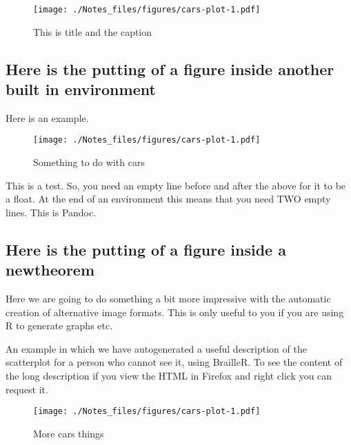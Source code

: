 \documentclass[
  10pt,
  english,
  a4paper]{article}
\theoremstyle{plain}
\theoremstyle{definition}
\theoremstyle{plain}
\theoremstyle{plain}
\theoremstyle{plain}
\theoremstyle{plain}
\theoremstyle{plain}
\theoremstyle{definition}
\theoremstyle{definition}
\theoremstyle{remark}
\theoremstyle{remark}
\let\BeginKnitrBlock\begin \let\EndKnitrBlock\end
\begin{document}
\begin{figure}
\centering
\texttt{[image: ./Notes\_files/figures/cars-plot-1.pdf]}
\caption{\label{fig:cars1}This is title and the caption}
\end{figure}

\hypertarget{here-is-the-putting-of-a-figure-inside-another-built-in-environment}{%
\subsection{Here is the putting of a figure inside another built in environment}\label{here-is-the-putting-of-a-figure-inside-another-built-in-environment}}

\BeginKnitrBlock{example}
{\label{exm:unnamed-chunk-4} }Here is an example.

\begin{figure}
\centering
\texttt{[image: ./Notes\_files/figures/cars-plot-1.pdf]}
\caption{\label{fig:cars2}Something to do with cars}
\end{figure}

This is a test. So, you need an empty line before and after the above for it to be a float. At the end of an environment this means that you need TWO empty lines. This is Pandoc.
\EndKnitrBlock{example}

\hypertarget{here-is-the-putting-of-a-figure-inside-a-newtheorem}{%
\subsection{Here is the putting of a figure inside a newtheorem}\label{here-is-the-putting-of-a-figure-inside-a-newtheorem}}

Here we are going to do something a bit more impressive with the automatic creation of alternative image formats. This is only useful to you if you are using R to generate graphs etc.

\BeginKnitrBlock{Example}
{\iffalse{} (\#\url{Example:unnamed-chunk-5}) \fi{}}An example in which we have autogenerated a useful description of the scatterplot for a person who cannot see it, using BrailleR. To see the content of the long description if you view the HTML in Firefox and right click you can request it.

\begin{figure}
\centering
\texttt{[image: ./Notes\_files/figures/cars-plot-1.pdf]}
\caption{\label{fig:cars3}More cars things}
\end{figure}
\EndKnitrBlock{Example}
\end{document}
